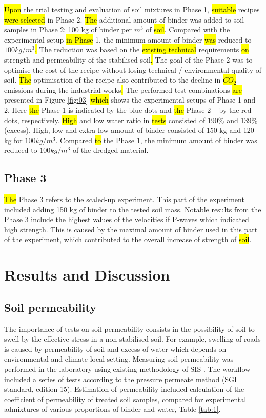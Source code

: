 \documentclass{amestyle}
\begin{document}
\hl{Upon} the trial testing and evaluation of soil mixtures in Phase 1, \hl{suitable} recipes \hl{were selected} in Phase 2. \hl{The} additional amount of binder was added to soil samples in Phase 2: 100 kg of binder per $m^3$ of \hl{soil}. Compared with the experimental setup \hl{in Phase} 1, the minimum amount of binder \hl{was} reduced to $100 kg/m^3$\hl{. }The reduction was based on the \hl{existing technical} requirements \hl{on} strength and permeability of the stabilised soil\hl{.} The goal of the Phase 2 was to optimise the cost of the recipe without losing technical / environmental quality of soil. \hl{The} optimisation of the recipe also contributed to the decline in \hl{$CO_2$} emissions during the industrial works\hl{.} The performed test combinations \hl{are} presented in Figure \ref{fig:03} \hl{which} shows the experimental setups of Phase 1 and 2. Here \hl{the} Phase 1 is indicated by the blue dots and \hl{the} Phase 2 -- by the red dots, respectively. \hl{High} and low water ratio in \hl{tests} consisted of 190\% and 139\% (excess). High, low and extra low amount of binder consisted of 150 kg and 120 kg for $100 kg/m^3$. Compared \hl{to} the Phase 1, the minimum amount of binder was reduced to $100 kg/m^3$ of the dredged material. 

\subsection{Phase 3}

\hl{The} Phase 3 refers to the scaled-up experiment. This part of the experiment included adding 150 kg of binder to the tested soil mass. Notable results from the Phase 3 include the highest values of the velocities if P-waves which indicated high strength. This is caused by the maximal amount of binder used in this part of the experiment, which contributed to the overall increase of strength of \hl{soil}. 

\section{Results and Discussion}

\subsection{Soil permeability}
The importance of tests on soil permeability consists in the possibility of soil to swell by the effective stress in a non-stabilised soil. For example, swelling of roads is caused by permeability of soil and excess of water which depends on environmental and climate local setting. Measuring soil permeability was performed in the laboratory using existing methodology of SIS \cite{SIS2019}. The workflow included a series of tests according to the pressure permeate method (SGI standard, edition 15). Estimation of permeability included calculation of the coefficient of permeability of treated soil samples, compared for experimental admixtures of various proportions of binder and water, Table \ref{tab:1}.
\end{document}

